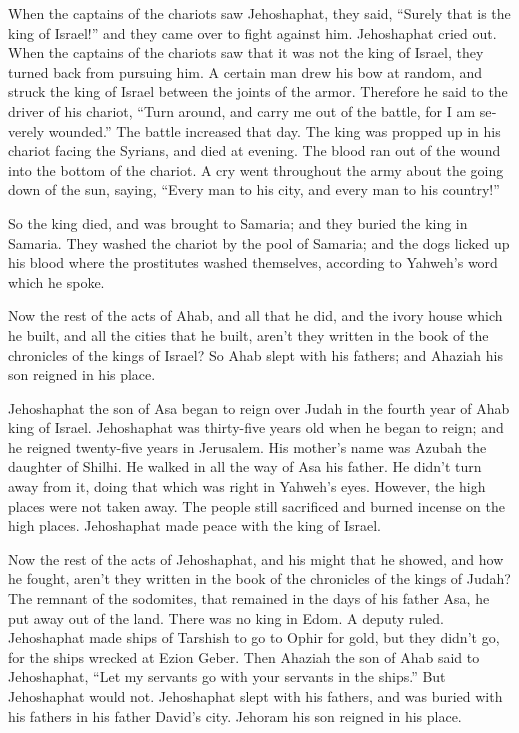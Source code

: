\begin{paracol}{2}
\begin{otherlanguage}{english}
 When the captains of the chariots saw Jehoshaphat, they
said, ``Surely that is the king of Israel!'' and they came over to fight
against him. Jehoshaphat cried out.  When the captains of
the chariots saw that it was not the king of Israel, they turned back
from pursuing him.  A certain man drew his bow at random,
and struck the king of Israel between the joints of the armor. Therefore
he said to the driver of his chariot, ``Turn around, and carry me out of
the battle, for I am severely wounded.''  The battle
increased that day. The king was propped up in his chariot facing the
Syrians, and died at evening. The blood ran out of the wound into the
bottom of the chariot.  A cry went throughout the army
about the going down of the sun, saying, ``Every man to his city, and
every man to his country!''

 So the king died, and was brought to Samaria; and they
buried the king in Samaria.  They washed the chariot by
the pool of Samaria; and the dogs licked up his blood where the
prostitutes washed themselves, according to Yahweh's word which he
spoke.

 Now the rest of the acts of Ahab, and all that he did,
and the ivory house which he built, and all the cities that he built,
aren't they written in the book of the chronicles of the kings of
Israel?  So Ahab slept with his fathers; and Ahaziah his
son reigned in his place.

 Jehoshaphat the son of Asa began to reign over Judah in
the fourth year of Ahab king of Israel.  Jehoshaphat was
thirty-five years old when he began to reign; and he reigned twenty-five
years in Jerusalem. His mother's name was Azubah the daughter of Shilhi.
 He walked in all the way of Asa his father. He didn't
turn away from it, doing that which was right in Yahweh's eyes. However,
the high places were not taken away. The people still sacrificed and
burned incense on the high places.  Jehoshaphat made
peace with the king of Israel.

 Now the rest of the acts of Jehoshaphat, and his might
that he showed, and how he fought, aren't they written in the book of
the chronicles of the kings of Judah?  The remnant of the
sodomites, that remained in the days of his father Asa, he put away out
of the land.  There was no king in Edom. A deputy ruled.
 Jehoshaphat made ships of Tarshish to go to Ophir for
gold, but they didn't go, for the ships wrecked at Ezion Geber.
 Then Ahaziah the son of Ahab said to Jehoshaphat, ``Let
my servants go with your servants in the ships.'' But Jehoshaphat would
not.  Jehoshaphat slept with his fathers, and was buried
with his fathers in his father David's city. Jehoram his son reigned in
his place.


\end{otherlanguage}
\end{paracol}
